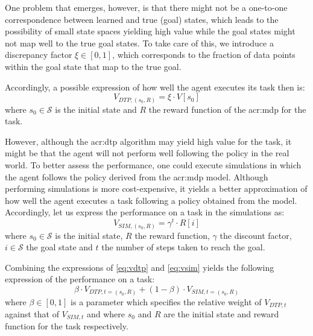One problem that emerges, however, is that there might not be a one-to-one correspondence between learned and true (goal) states, which leads to the possibility of small state spaces yielding high value while the goal states might not map well to the true goal states.
To take care of this, we introduce a discrepancy factor $\xi \in [0, 1]$, which corresponds to the fraction of data points within the goal state that map to the true goal.

Accordingly, a possible expression of how well the agent executes its task then is:
\begin{equation}
\label{eq:vdtp}
V_{\mathit{DTP},(s_0,R)} = \xi \cdot V[s_0]
\end{equation}
where $s_0 \in \mathcal{S}$ is the initial state and $R$ the reward function of the \acrshort{acr:mdp} for the task.

However, although the \acrshort{acr:dtp} algorithm may yield high value for the task, it might be that the agent will not perform well following the policy in the real world.
To better assess the performance, one could execute simulations in which the agent follows the policy derived from the \acrshort{acr:mdp} model.
Although performing simulations is more cost-expensive, it yields a better approximation of how well the agent executes a task following a policy obtained from the model.
Accordingly, let us express the performance on a task in the simulations as:
\begin{equation}
\label{eq:vsim}
V_{\mathit{SIM}, (s_0, R)} = \gamma^{t} \cdot R[i]
\end{equation}
where $s_0 \in \mathcal{S}$ is the initial state, $R$ the reward function, $\gamma$ the discount factor, $i \in \mathcal{S}$ the goal state and $t$ the number of steps taken to reach the goal.

Combining the expressions of \autoref{eq:vdtp} and \autoref{eq:vsim} yields the following expression of the performance on a task:
\begin{equation}
\label{eq:vcom}
\beta \cdot V_{\mathit{DTP}, t=(s_0, R)} + (1 - \beta) \cdot V_{\mathit{SIM}, t=(s_0, R)}
\end{equation}
where $\beta \in [0, 1]$ is a parameter which specifies the relative weight of $V_{\mathit{DTP}, t}$ against that of $V_{\mathit{SIM}, t}$ and where $s_0$ and $R$ are the initial state and reward function for the task respectively.

